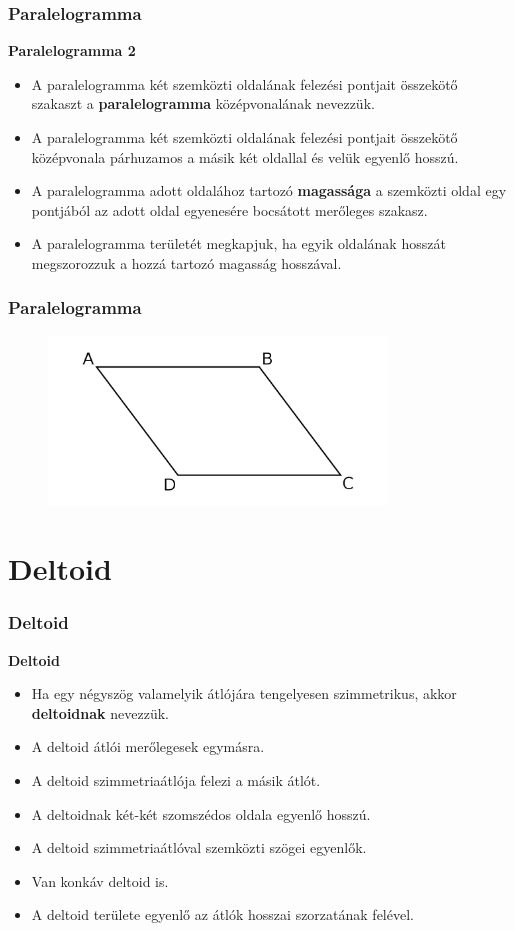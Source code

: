 \documentclass[11pt]{beamer}
\begin{document}
\begin{frame}[<+->]
\frametitle{Paralelogramma}
\begin{block}{\textbf{Paralelogramma 2}}
\begin{itemize}[label=$\circ$]
\item A paralelogramma két szemközti oldalának felezési pontjait összekötő szakaszt a \textbf{paralelogramma} középvonalának nevezzük.
\item A paralelogramma két szemközti oldalának felezési pontjait összekötő középvonala párhuzamos a másik két oldallal és velük egyenlő hosszú.
\item A paralelogramma adott oldalához tartozó \textbf{magassága} a szemközti oldal egy pontjából az
adott oldal egyenesére bocsátott merőleges szakasz.
\item A paralelogramma területét megkapjuk, ha egyik oldalának hosszát megszorozzuk a hozzá tartozó magasság hosszával.
\end{itemize}
\end{block}
\end{frame}

\begin{frame}
\frametitle{Paralelogramma}
\begin{figure}
  \includegraphics[width=0.8\textwidth]{paralelogram.png}
\end{figure}
\end{frame}

\section{\textbf{Deltoid}}
\begin{frame}[<+->]
\frametitle{Deltoid}
\begin{block}{\textbf{Deltoid}}
\begin{itemize}[label=$\circ$]
\item Ha egy négyszög valamelyik átlójára tengelyesen szimmetrikus, akkor \textbf{deltoidnak} nevezzük.
\item A deltoid átlói merőlegesek egymásra.
\item A deltoid szimmetriaátlója felezi a másik átlót.
\item A deltoidnak két-két szomszédos oldala egyenlő hosszú.
\item A deltoid szimmetriaátlóval szemközti szögei egyenlők.
\item Van konkáv deltoid is.
\item A deltoid területe egyenlő az átlók hosszai szorzatának felével.
\end{itemize}
\end{block}
\end{frame}
\end{document}
